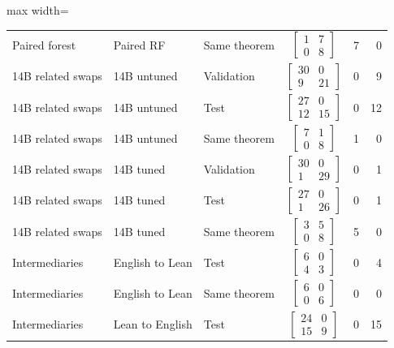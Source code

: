 \begin{table}[htbp]
\begin{adjustbox}{max width=\textwidth}
\begin{tabular}{lllcrr}
Paired forest & Paired RF & Same theorem & $\left[\begin{smallmatrix}1&7\\0&8\end{smallmatrix}\right]$ & 7 & 0 \\
14B related swaps & 14B untuned & Validation & $\left[\begin{smallmatrix}30&0\\9&21\end{smallmatrix}\right]$ & 0 & 9 \\
14B related swaps & 14B untuned & Test & $\left[\begin{smallmatrix}27&0\\12&15\end{smallmatrix}\right]$ & 0 & 12 \\
14B related swaps & 14B untuned & Same theorem & $\left[\begin{smallmatrix}7&1\\0&8\end{smallmatrix}\right]$ & 1 & 0 \\
14B related swaps & 14B tuned & Validation & $\left[\begin{smallmatrix}30&0\\1&29\end{smallmatrix}\right]$ & 0 & 1 \\
14B related swaps & 14B tuned & Test & $\left[\begin{smallmatrix}27&0\\1&26\end{smallmatrix}\right]$ & 0 & 1 \\
14B related swaps & 14B tuned & Same theorem & $\left[\begin{smallmatrix}3&5\\0&8\end{smallmatrix}\right]$ & 5 & 0 \\
Intermediaries & English to Lean & Test & $\left[\begin{smallmatrix}6&0\\4&3\end{smallmatrix}\right]$ & 0 & 4 \\
Intermediaries & English to Lean & Same theorem & $\left[\begin{smallmatrix}6&0\\0&6\end{smallmatrix}\right]$ & 0 & 0 \\
Intermediaries & Lean to English & Test & $\left[\begin{smallmatrix}24&0\\15&9\end{smallmatrix}\right]$ & 0 & 15 \\

\end{tabular}
\end{adjustbox}
\end{table}
